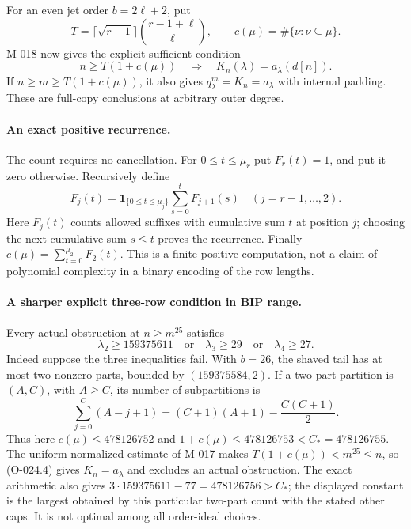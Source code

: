 For an even jet order $b=2\ell+2$, put
\[
 T=\lceil\sqrt{r-1}\rceil\binom{r-1+\ell}{\ell},
 \qquad c(\mu)=\#\{\nu:\nu\subseteq\mu\}.
\]
M-018 now gives the explicit sufficient condition
\[
 n\geq T(1+c(\mu))
       \quad\Longrightarrow\quad K_n(\lambda)=a_\lambda(d[n]).
                                                               \tag{O-024.4}
\]
If $n\geq m\geq T(1+c(\mu))$, it also gives
$q^m_\lambda=K_n=a_\lambda$ with internal padding.
These are full-copy conclusions at arbitrary outer degree.

\paragraph{An exact positive recurrence.}
The count requires no cancellation. For $0\leq t\leq\mu_r$
put $F_r(t)=1$, and put it zero otherwise.
Recursively define
\[
 F_j(t)=\mathbf1_{\{0\leq t\leq\mu_j\}}
                         \sum_{s=0}^t F_{j+1}(s)
                    \quad(j=r-1,\ldots,2).
                                                               \tag{O-024.5}
\]
Here $F_j(t)$ counts allowed suffixes with cumulative
sum $t$ at position $j$; choosing the next cumulative
sum $s\leq t$ proves the recurrence.
Finally $c(\mu)=\sum_{t=0}^{\mu_2}F_2(t)$.
This is a finite positive computation, not a claim of
polynomial complexity in a binary encoding of the row lengths.

\paragraph{A sharper explicit three-row condition in BIP range.}
Every actual obstruction at $n\geq m^{25}$ satisfies
\[
 \boxed{\lambda_2\geq159375611\quad\text{or}\quad
          \lambda_3\geq29\quad\text{or}\quad\lambda_4\geq27.}
                                                               \tag{O-024.6}
\]
Indeed suppose the three inequalities fail. With $b=26$,
the shaved tail has at most two nonzero parts, bounded
by $(159375584,2)$. If a two-part partition is $(A,C)$,
with $A\geq C$, its number of subpartitions is
\[
                  \sum_{j=0}^C(A-j+1)
                 =(C+1)(A+1)-\frac{C(C+1)}2.
                                                               \tag{O-024.7}
\]
Thus here
$c(\mu)\leq478126752$ and
$1+c(\mu)\leq478126753<C_*=478126755$.
The uniform normalized estimate of M-017 makes
$T(1+c(\mu))<m^{25}\leq n$, so (O-024.4)
gives $K_n=a_\lambda$ and excludes an actual obstruction.
The exact arithmetic also gives
$3\cdot159375611-77=478126756>C_*$;
the displayed constant is the largest obtained by this
particular two-part count with the stated other caps.
It is not optimal among all order-ideal choices.

